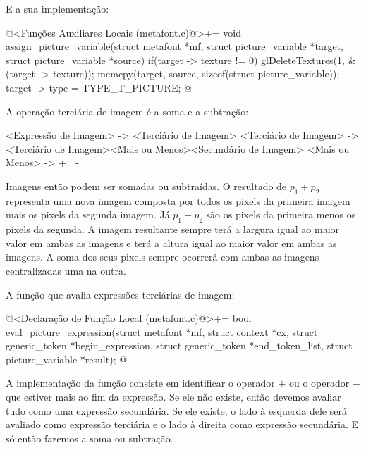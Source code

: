 {E a sua implementação:

\iniciocodigo
@<Funções Auxiliares Locais (metafont.c)@>+=
void assign_picture_variable(struct metafont *mf,
                             struct picture_variable *target,
                             struct picture_variable *source){
  if(target -> texture != 0)
    glDeleteTextures(1, &(target -> texture));
  memcpy(target, source, sizeof(struct picture_variable));
  target -> type = TYPE_T_PICTURE;
}
@
\fimcodigo


A operação terciária de imagem é a soma e a subtração:

\alinhaverbatim
<Expressão de Imagem> -> <Terciário de Imagem>
<Terciário de Imagem> -> <Terciário de Imagem><Mais ou Menos><Secundário de Imagem>
<Mais ou Menos> -> + | -
\alinhanormal

Imagens então podem ser somadas ou subtraídas. O resultado de
$p_1+p_2$ representa uma nova imagem composta por todos os pixels da
primeira imagem mais os pixels da segunda imagem. Já $p_1-p_2$ são os
pixels da primeira menos os pixels da segunda.  A imagem resultante
sempre terá a largura igual ao maior valor em ambas as imagens e terá
a altura igual ao maior valor em ambas as imagens. A soma dos seus
pixels sempre ocorrerá com ambas as imagens centralizadas uma na
outra.

A função que avalia expressões terciárias de imagem:

\iniciocodigo
@<Declaração de Função Local (metafont.c)@>+=
bool eval_picture_expression(struct metafont *mf, struct context *cx,
                             struct generic_token *begin_expression,
                             struct generic_token *end_token_list,
                             struct picture_variable *result);
@
\fimcodigo

A implementação da função consiste em identificar o operador $+$ ou o
operador $-$ que estiver mais ao fim da expressão. Se ele não existe,
então devemos avaliar tudo como uma expressão secundária. Se ele
existe, o lado à esquerda dele será avaliado como expressão terciária
e o lado à direita como expressão secundária. E só então fazemos a
soma ou subtração.

}
